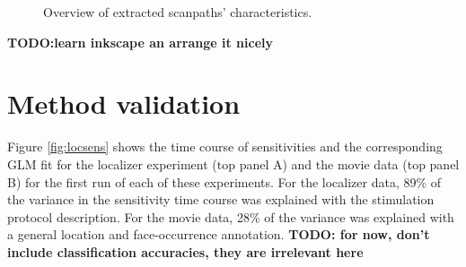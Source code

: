 \documentclass[a4paper, 12pt]{scrreprt}
\begin{document}
{\begin{figure}[H]
	\caption{\small{Overview of extracted scanpaths' characteristics.}}
	\label{fig:dist_hist}
\end{figure}
	\textbf{TODO:learn inkscape an arrange it nicely}}

\bigskip

\section{Method validation}\label{section:results_method}
Figure \ref{fig:locsens} shows the time course of sensitivities and the corresponding GLM fit for the localizer experiment (top panel A) and the movie data (top panel B) for the first run of each of these experiments. For the localizer data, 89\% of the variance in the sensitivity time course was explained with the stimulation protocol description. For the movie data, 28\% of the variance was explained with a general location and face-occurrence annotation.
\textbf{TODO: for now, don't include classification accuracies, they are irrelevant here}
\end{document}
